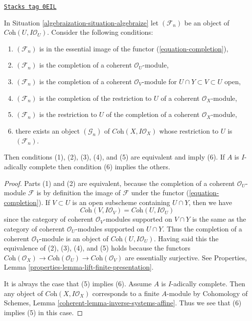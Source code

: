 \begin{lemma}
\label{algebraization-lemma-essential-image-completion}
\href{https://stacks.math.columbia.edu/tag/0EIL}{\texttt{Stacks tag 0EIL}}

In Situation \ref{algebraization-situation-algebraize} let $(\mathcal{F}_n)$
be an object of $\textit{Coh}(U, I\mathcal{O}_U)$. Consider the
following conditions:
\begin{enumerate}
\item $(\mathcal{F}_n)$ is in the essential image
of the functor (\ref{equation-completion}),
\item $(\mathcal{F}_n)$ is the completion of a
coherent $\mathcal{O}_U$-module,
\item $(\mathcal{F}_n)$ is the completion of a coherent
$\mathcal{O}_V$-module for $U \cap Y \subset V \subset U$ open,
\item $(\mathcal{F}_n)$ is the completion of
the restriction to $U$ of a coherent $\mathcal{O}_X$-module,
\item $(\mathcal{F}_n)$ is the restriction to $U$ of
the completion of a coherent $\mathcal{O}_X$-module,
\item there exists an object $(\mathcal{G}_n)$ of
$\textit{Coh}(X, I\mathcal{O}_X)$ whose restriction
to $U$ is $(\mathcal{F}_n)$.
\end{enumerate}
Then conditions (1), (2), (3), (4), and (5) are equivalent and imply (6).
If $A$ is $I$-adically complete then condition (6) implies the others.
\end{lemma}

\begin{proof}
Parts (1) and (2) are equivalent, because the completion of a coherent
$\mathcal{O}_U$-module $\mathcal{F}$ is by definition the image of
$\mathcal{F}$ under the functor (\ref{equation-completion}).
If $V \subset U$ is an open subscheme containing $U \cap Y$, then we have
$$
\textit{Coh}(V, I\mathcal{O}_V) =
\textit{Coh}(U, I\mathcal{O}_U)
$$
since the category of coherent $\mathcal{O}_V$-modules supported on
$V \cap Y$ is the same as the category of coherent $\mathcal{O}_U$-modules
supported on $U \cap Y$. Thus the completion of a coherent
$\mathcal{O}_V$-module is an object of $\textit{Coh}(U, I\mathcal{O}_U)$.
Having said this the equivalence of (2), (3), (4), and (5)
holds because the functors
$\textit{Coh}(\mathcal{O}_X) \to \textit{Coh}(\mathcal{O}_U) \to
\textit{Coh}(\mathcal{O}_V)$ are essentially surjective.
See Properties, Lemma \ref{properties-lemma-lift-finite-presentation}.

\medskip\noindent
It is always the case that (5) implies (6). Assume $A$ is $I$-adically complete.
Then any object of $\textit{Coh}(X, I\mathcal{O}_X)$ corresponds to a finite
$A$-module by Cohomology of Schemes, Lemma
\ref{coherent-lemma-inverse-systems-affine}.
Thus we see that (6) implies (5) in this case.
\end{proof}

